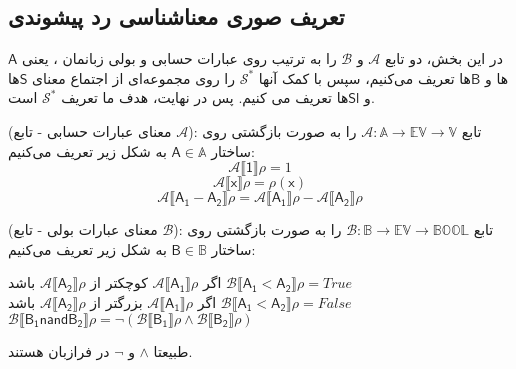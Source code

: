 \subsection{تعریف صوری معناشناسی رد پیشوندی}
در این بخش، دو تابع $\mathcal{A}$ و $\mathcal{B}$ را به ترتیب روی عبارات حسابی و بولی زبانمان ، یعنی $\mathsf{A}$ها و $\mathsf{B}$ها تعریف می‌کنیم، سپس با کمک آنها $\mathcal{S^*}$ را روی  مجموعه‌ای از اجتماع معنای $\mathsf{S}$ها و $\mathsf{Sl}$ها تعریف می کنیم. پس در نهایت، هدف ما تعریف  $\mathcal{S^*}$ است.


\begin{defn}
	(معنای عبارات حسابی - تابع $\mathcal{A}$): تابع 
	$\mathcal{A}:\mathbb{A}\rightarrow \mathbb{EV} \rightarrow \mathbb{V}$
	را به صورت بازگشتی روی ساختار 
	$\mathsf{A} \in \mathbb{A}$
	به شکل زیر تعریف می‌کنیم:
	$$\mathcal{A\llbracket\mathsf{1}\rrbracket\rho = }1     $$
	$$\mathcal{A\llbracket\mathsf{x}\rrbracket\rho = } \rho(\mathsf{x})          $$
	$$\mathcal{A\llbracket\mathsf{A_1-A_2}\rrbracket\rho = }\mathcal{A\llbracket\mathsf{A_1}\rrbracket\rho }- \mathcal{A\llbracket\mathsf{A_2}\rrbracket\rho }       $$
	
\end{defn}

\begin{defn}
	(معنای عبارات بولی - تابع $\mathcal{B}$): تابع 
	$\mathcal{B}: \mathbb{B} \rightarrow \mathbb{EV} \rightarrow \mathbb{BOOL}$
	را به صورت بازگشتی روی ساختار 
	$\mathsf{B} \in \mathbb{B}$
	به شکل زیر تعریف می‌کنیم:
	
	\begin{center}
		اگر $\mathcal{A\llbracket\mathsf{A_1}\rrbracket\rho }$ کوچکتر از $\mathcal{A\llbracket\mathsf{A_2}\rrbracket\rho }$ باشد
		$\mathcal{B\llbracket\mathsf{A_1<A_2}\rrbracket\rho = } True   \hspace{2cm}  $\\
		اگر $\mathcal{A\llbracket\mathsf{A_1}\rrbracket\rho }$ بزرگتر از $\mathcal{A\llbracket\mathsf{A_2}\rrbracket\rho }$ باشد
		$\mathcal{B\llbracket\mathsf{A_1<A_2}\rrbracket\rho = } False   \hspace{2cm}  $\\
		$ \mathcal{B\llbracket\mathsf{B_1 nand B_2}\rrbracket\rho = } \neg(\mathcal{B\llbracket\mathsf{B_1}\rrbracket\rho}   \wedge \mathcal{B\llbracket\mathsf{B_2}\rrbracket\rho}) $
	\end{center}
\end{defn}

طبیعتا $\wedge$ و $\neg$ در فرازبان هستند.\\

